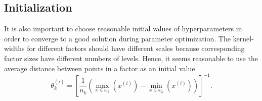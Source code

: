 \subsection{Initialization}
\label{sec:tensor_gp_init}
It is also important to choose reasonable initial values of hyperparameters
in order to converge to a good solution during parameter optimization.
The kernel-widths for different factors should have different scales because
corresponding factor sizes have different numbers of levels.
Hence, it seems reasonable to use the average distance between points in a factor as an initial value
\begin{equation}
  \label{eq:initialization}
  \theta_k^{(i)} = \left [ \frac{1}{n_k} \left ( \max\limits_{x \in \omega_k}(x^{(i)}) - \min\limits_{x \in \omega_k}(x^{(i)}) \right ) \right ]^{-1}.
\end{equation}

